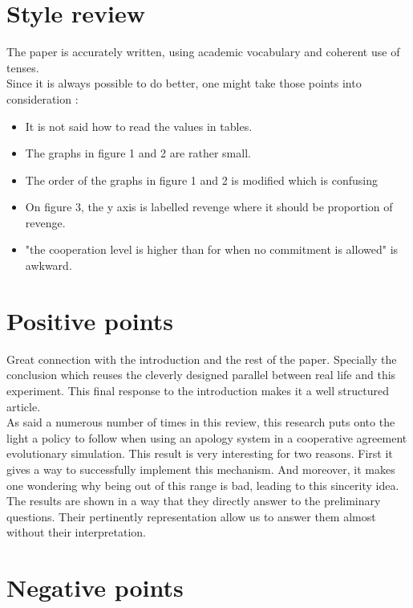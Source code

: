 \documentclass{article}
\begin{document}
\section{Style review}
The paper is accurately written, using academic vocabulary and coherent use of tenses.\\
Since it is always possible to do better, one might take those points into consideration :
\begin{itemize}
\item It is not said how to read the values in tables.
\item The graphs in figure 1 and 2 are rather small.
\item The order of the graphs in figure 1 and 2 is modified which is confusing
\item On figure 3, the y axis is labelled revenge where it should be proportion of revenge. 
\item "the cooperation level is higher than for when no commitment is allowed" is awkward.
\end{itemize}


\section{Positive points}

Great connection with the introduction and the rest of the paper. Specially the conclusion which reuses the cleverly designed parallel between real life and this experiment. This final response to the introduction makes it a well structured article.\\

As said a numerous number of times in this review, this research puts onto the light a policy to follow when using an apology system in a cooperative agreement evolutionary simulation. This result is very interesting for two reasons. First it gives a way to successfully implement this mechanism. And moreover, it makes one wondering why being out of this range is bad, leading to this sincerity idea.\\

The results are shown in a way that they directly answer to the preliminary questions. Their pertinently representation allow us to answer them almost without their interpretation.


\section{Negative points}
\end{document}
